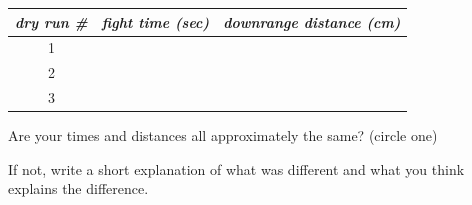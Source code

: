 \begin{center}
    \renewcommand{\arraystretch}{1.5}
    \begin{tabular}{c|p{2in}|p{2in}}
        \toprule
        {\itshape dry run \#} & {\itshape fight time (sec)} & {\itshape downrange distance (cm)} \\
        \toprule
        1 & & \\
        \midrule
        2 & & \\
        \midrule
        3 & & \\
        \bottomrule
    \end{tabular}
\end{center}

Are your times and distances all approximately the same? 
\qquad
{}
\qquad
{}
\qquad
(circle one)

If not, write a short explanation of what was different and 
what you think explains the difference.
\vspace{1em}

{
\underline{\hspace{\textwidth}}\\[0.5\baselineskip]
\underline{\hspace{\textwidth}}\\[0.5\baselineskip]
\underline{\hspace{\textwidth}}\\[0.5\baselineskip]
\underline{\hspace{\textwidth}}\\[0.5\baselineskip]
\underline{\hspace{\textwidth}}\\[0.5\baselineskip]
\underline{\hspace{\textwidth}}\\[0.5\baselineskip]
}
